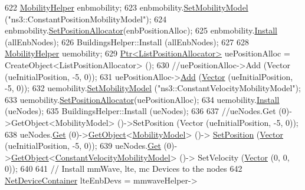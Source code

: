 \begin{DoxyCode}
{622   \hyperlink{classns3_1_1MobilityHelper}{MobilityHelper} enbmobility;
623   enbmobility.\hyperlink{classns3_1_1MobilityHelper_a030275011b6f40682e70534d30280aba}{SetMobilityModel} (\textcolor{stringliteral}{"ns3::ConstantPositionMobilityModel"});
624   enbmobility.\hyperlink{classns3_1_1MobilityHelper_ac59d5295076be3cc11021566713a28c5}{SetPositionAllocator}(enbPositionAlloc);
625   enbmobility.\hyperlink{classns3_1_1MobilityHelper_a07737960ee95c0777109cf2994dd97ae}{Install} (allEnbNodes);
626   BuildingsHelper::Install (allEnbNodes);
627 
628   \hyperlink{classns3_1_1MobilityHelper}{MobilityHelper} uemobility;
629   \hyperlink{classns3_1_1Ptr}{Ptr<ListPositionAllocator>} uePositionAlloc = 
      CreateObject<ListPositionAllocator> ();
630   \textcolor{comment}{//uePositionAlloc->Add (Vector (ueInitialPosition, -5, 0));}
631   uePositionAlloc->\hyperlink{classns3_1_1ListPositionAllocator_a460e82f015ac012a73ba0ea0cccb3486}{Add} (\hyperlink{classns3_1_1Vector3D_a7e59b47bc94c9cb1dadff68c1d0112d8}{Vector} (ueInitialPosition, -5, 0));
632   uemobility.\hyperlink{classns3_1_1MobilityHelper_a030275011b6f40682e70534d30280aba}{SetMobilityModel} (\textcolor{stringliteral}{"ns3::ConstantVelocityMobilityModel"});
633   uemobility.\hyperlink{classns3_1_1MobilityHelper_ac59d5295076be3cc11021566713a28c5}{SetPositionAllocator}(uePositionAlloc);
634   uemobility.\hyperlink{classns3_1_1MobilityHelper_a07737960ee95c0777109cf2994dd97ae}{Install} (ueNodes);
635   BuildingsHelper::Install (ueNodes);
636 
637   \textcolor{comment}{//ueNodes.Get (0)->GetObject<MobilityModel> ()->SetPosition (Vector (ueInitialPosition, -5, 0));}
638   ueNodes.\hyperlink{classns3_1_1NodeContainer_a9ed96e2ecc22e0f5a3d4842eb9bf90bf}{Get} (0)->\hyperlink{classns3_1_1Object_a13e18c00017096c8381eb651d5bd0783}{GetObject}<\hyperlink{classns3_1_1MobilityModel}{MobilityModel}> ()->
      \hyperlink{lena-cqi-threshold_8cc_aac02abe91b3e5592e31bc0f7d844bf4d}{SetPosition} (\hyperlink{classns3_1_1Vector3D_a7e59b47bc94c9cb1dadff68c1d0112d8}{Vector} (ueInitialPosition, -5, 0));
639   ueNodes.\hyperlink{classns3_1_1NodeContainer_a9ed96e2ecc22e0f5a3d4842eb9bf90bf}{Get} (0)->\hyperlink{classns3_1_1Object_a13e18c00017096c8381eb651d5bd0783}{GetObject}<\hyperlink{classns3_1_1ConstantVelocityMobilityModel}{ConstantVelocityMobilityModel}> ()->
      SetVelocity (\hyperlink{classns3_1_1Vector3D_a7e59b47bc94c9cb1dadff68c1d0112d8}{Vector} (0, 0, 0));
640 
641   \textcolor{comment}{// Install mmWave, lte, mc Devices to the nodes}
642   \hyperlink{classns3_1_1NetDeviceContainer}{NetDeviceContainer} lteEnbDevs = mmwaveHelper->
}
\end{DoxyCode}
